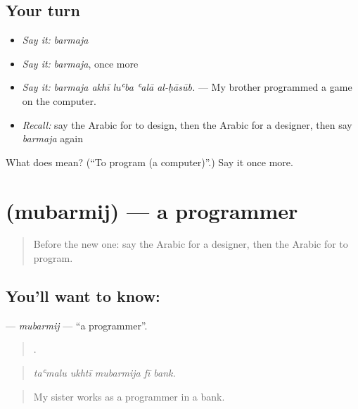 \subsection*{Your turn}
\begin{itemize}
\raggedright
  \item \emph{Say it:} \emph{barmaja}
  \item \emph{Say it:} \emph{barmaja}, once more
  \item \emph{Say it:} \emph{barmaja akhī luʿba ʿalā al-ḥāsūb.} — My brother programmed a game on the computer.
  \item \emph{Recall:} say the Arabic for to design, then the Arabic for a designer, then say \emph{barmaja} again
\end{itemize}

\begin{tcolorbox}[breakable,colback=teal!4,colframe=teal!35!black,title={Before you move on}]
What does  mean? (\textquotedblleft{}To program (a computer)\textquotedblright{}.) Say it once more.
\end{tcolorbox}
\section[\texorpdfstring{\ar{مبرمج} (mubarmij)}{مبرمج (mubarmij)}]{ (mubarmij) — a programmer}

\label{lesson:AR-C525-mubarmij}



\begin{quote}
Before the new one: say the Arabic for a designer, then the Arabic for to program.
\end{quote}

\subsection*{You'll want to know: }
\textbf{} — \emph{mubarmij} — \textquotedblleft{}a programmer\textquotedblright{}.

\begin{quote}
    .
\end{quote}

\begin{quote}
\emph{taʿmalu ukhtī mubarmija fī bank.}
\end{quote}

\begin{quote}
My sister works as a programmer in a bank.
\end{quote}

